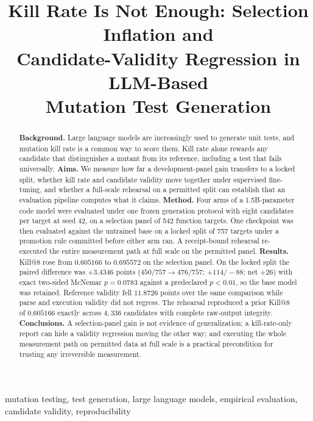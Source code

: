 \documentclass[10pt,conference,letterpaper]{IEEEtran}
\makeatletter
\newcommand{\killk}[1]{Kill@#1}
\makeatother
\begin{document}
\title{Kill Rate Is Not Enough: Selection Inflation and\\
Candidate-Validity Regression in LLM-Based\\
Mutation Test Generation}

\author{\IEEEauthorblockN{}\IEEEauthorblockA{}}

\maketitle

\begin{abstract}
\textbf{Background.} Large language models are increasingly used to generate
unit tests, and mutation kill rate is a common way to score them. Kill rate
alone rewards any candidate that distinguishes a mutant from its reference,
including a test that fails universally.
\textbf{Aims.} We measure how far a development-panel gain transfers to a locked
split, whether kill rate and candidate validity move together under supervised
fine-tuning, and whether a full-scale rehearsal on a permitted split can
establish that an evaluation pipeline computes what it claims.
\textbf{Method.} Four arms of a 1.5B-parameter code model were evaluated under
one frozen generation protocol with eight candidates per target at seed 42, on a
selection panel of 542 function targets. One checkpoint was then evaluated
against the untrained base on a locked split of 757 targets under a promotion
rule committed before either arm ran. A receipt-bound rehearsal re-executed the
entire measurement path at full scale on the permitted panel.
\textbf{Results.} \killk{8} rose from $0.605166$ to $0.695572$ on the selection
panel. On the locked split the paired difference was $+3.4346$ points
($450/757 \to 476/757$; $+114/-88$; net $+26$) with exact two-sided McNemar
$p = 0.0783$ against a predeclared $p < 0.01$, so the base model was retained.
Reference validity fell $11.8726$ points over the same comparison while parse and
execution validity did not regress. The rehearsal reproduced a prior \killk{8}
of $0.605166$ exactly across $4{,}336$ candidates with complete raw-output
integrity.
\textbf{Conclusions.} A selection-panel gain is not evidence of generalization;
a kill-rate-only report can hide a validity regression moving the other way; and
executing the whole measurement path on permitted data at full scale is a
practical precondition for trusting any irreversible measurement.
\end{abstract}

\begin{IEEEkeywords}
mutation testing, test generation, large language models, empirical evaluation,
candidate validity, reproducibility
\end{IEEEkeywords}
\end{document}
